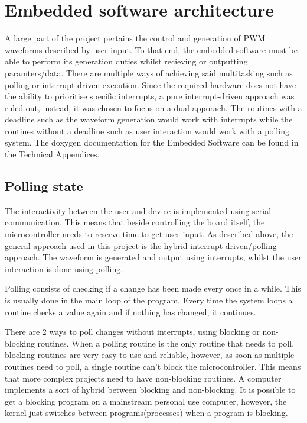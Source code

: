 \section{Embedded software architecture}
A large part of the project pertains the control and generation of PWM waveforms described by
user input. To that end, the embedded software must be able to perform its generation duties whilst
recieving or outputting paramters/data. There are multiple ways of achieving said multitasking such as
polling or interrupt-driven execution. Since the required hardware does not have the ability to prioritise
specific interrupts, a pure interrupt-driven approach was ruled out, instead, it was chosen to focus on a dual apporach. The routines with a deadline such as the waveform generation would work with interrupts while the routines without a deadline such as user interaction would work with a polling system. The doxygen documentation for the Embedded Software can be found in the Technical Appendices.

\subsection{Polling state}
The interactivity between the user and device is implemented using serial communication.
This means that beside controlling the board itself, the microcontroller needs to reserve
time to get user input. As described above, the general approach used in this project is
the hybrid interrupt-driven/polling approach. The waveform is generated and output using
interrupts, whilst the user interaction is done using polling.

Polling consists of checking if a change has been made every once in a while. This
is usually done in the main loop of the program. Every time the system loops a routine
checks a value again and if nothing has changed, it continues. 

There are 2 ways to poll changes without interrupts, using blocking or non-blocking routines.
When a polling routine is the only routine that needs to poll, blocking routines are
very easy to use and reliable, however, as soon as multiple routines need to poll, a single
routine can't block the microcontroller. This means that more complex projects need to have
non-blocking routines. A computer implements a sort of hybrid between blocking and non-blocking.
It is possible to get a blocking program on a mainstream personal use computer, however, the kernel
just switches between programs(processes) when a program is blocking.

